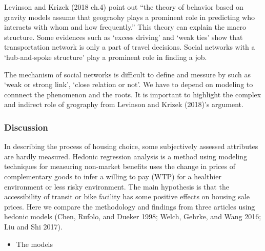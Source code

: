 \documentclass[12pt,]{article}
\providecommand{\tightlist}{%
  \setlength{\itemsep}{0pt}\setlength{\parskip}{0pt}}
\begin{document}
Levinson and Krizek (2018 ch.4) point out ``the theory of behavior based
on gravity models assume that geograohy plays a prominent role in
predicting who interacts with whom and how frequently.'' This theory can
explain the macro structure. Some evidences such as `excess driving' and
`weak ties' show that transportation network is only a part of travel
decisions. Social networks with a `hub-and-spoke structure' play a
prominent role in finding a job.

The mechanism of social networks is difficult to define and messure by
such as `weak or strong link', `close relation or not'. We have to
depend on modeling to connnect the phenomenon and the roots. It is
important to highlight the complex and indirect role of grography from
Levinson and Krizek (2018)'s argument.

\hypertarget{discussion}{%
\subsubsection{Discussion}\label{discussion}}

In describing the process of housing choice, some subjectively assessed
attributes are hardly measured. Hedonic regression analysis is a method
using modeling techniques for measuring non-market benefits uses the
change in prices of complementary goods to infer a willing to pay (WTP)
for a healthier environment or less risky environment. The main
hypothesis is that the accessibility of transit or bike facility has
some positive effects on housing sale prices. Here we compare the
methodology and findings from three articles using hedonic models (Chen,
Rufolo, and Dueker 1998; Welch, Gehrke, and Wang 2016; Liu and Shi
2017).

\begin{itemize}
\tightlist
\item
  The models
\end{itemize}
\end{document}
